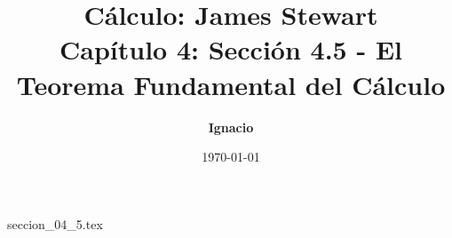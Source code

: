 \documentclass[11pt,spanish,oneside]{report}
\title{\textbf{Cálculo: James Stewart} \\ \Large Capítulo 4: Sección 4.5 - El Teorema Fundamental del Cálculo}
\author{\textbf{Ignacio}}
\date{\today}
\begin{document}
\maketitle

{seccion_04_5.tex}
\end{document}
